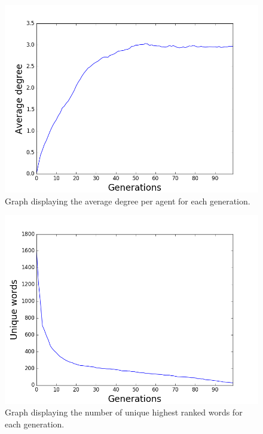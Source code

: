 \begin{figure}[htbp]
    \centering
    \includegraphics[scale=0.5]{fig/Results/Exp3/Degree1}
    \caption{Graph displaying the average degree per agent for each generation.}
    \label{fig:Degree3}
\end{figure}
\begin{figure}[htbp]
    \centering
    \includegraphics[scale=0.5]{fig/Results/Exp3/UniqueWords1}
    \caption{Graph displaying the number of unique highest ranked words for each generation.}
    \label{fig:UniqueWords3}
\end{figure}
